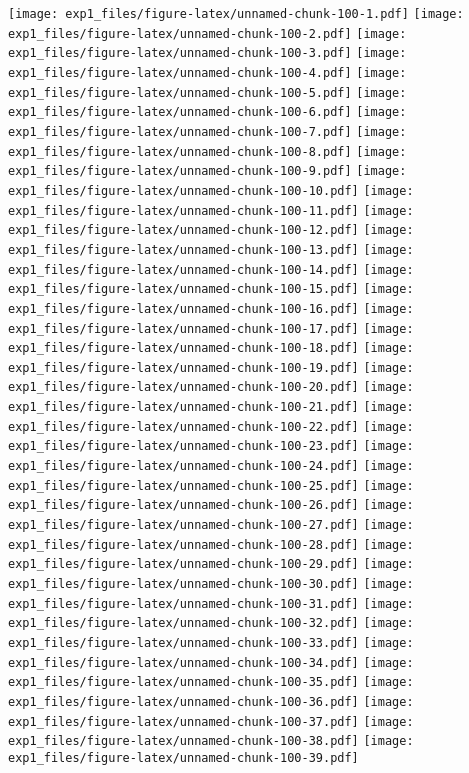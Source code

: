 \documentclass[11pt,,]{article}
\begin{document}
\texttt{[image: exp1\_files/figure-latex/unnamed-chunk-100-1.pdf]}
\texttt{[image: exp1\_files/figure-latex/unnamed-chunk-100-2.pdf]}
\texttt{[image: exp1\_files/figure-latex/unnamed-chunk-100-3.pdf]}
\texttt{[image: exp1\_files/figure-latex/unnamed-chunk-100-4.pdf]}
\texttt{[image: exp1\_files/figure-latex/unnamed-chunk-100-5.pdf]}
\texttt{[image: exp1\_files/figure-latex/unnamed-chunk-100-6.pdf]}
\texttt{[image: exp1\_files/figure-latex/unnamed-chunk-100-7.pdf]}
\texttt{[image: exp1\_files/figure-latex/unnamed-chunk-100-8.pdf]}
\texttt{[image: exp1\_files/figure-latex/unnamed-chunk-100-9.pdf]}
\texttt{[image: exp1\_files/figure-latex/unnamed-chunk-100-10.pdf]}
\texttt{[image: exp1\_files/figure-latex/unnamed-chunk-100-11.pdf]}
\texttt{[image: exp1\_files/figure-latex/unnamed-chunk-100-12.pdf]}
\texttt{[image: exp1\_files/figure-latex/unnamed-chunk-100-13.pdf]}
\texttt{[image: exp1\_files/figure-latex/unnamed-chunk-100-14.pdf]}
\texttt{[image: exp1\_files/figure-latex/unnamed-chunk-100-15.pdf]}
\texttt{[image: exp1\_files/figure-latex/unnamed-chunk-100-16.pdf]}
\texttt{[image: exp1\_files/figure-latex/unnamed-chunk-100-17.pdf]}
\texttt{[image: exp1\_files/figure-latex/unnamed-chunk-100-18.pdf]}
\texttt{[image: exp1\_files/figure-latex/unnamed-chunk-100-19.pdf]}
\texttt{[image: exp1\_files/figure-latex/unnamed-chunk-100-20.pdf]}
\texttt{[image: exp1\_files/figure-latex/unnamed-chunk-100-21.pdf]}
\texttt{[image: exp1\_files/figure-latex/unnamed-chunk-100-22.pdf]}
\texttt{[image: exp1\_files/figure-latex/unnamed-chunk-100-23.pdf]}
\texttt{[image: exp1\_files/figure-latex/unnamed-chunk-100-24.pdf]}
\texttt{[image: exp1\_files/figure-latex/unnamed-chunk-100-25.pdf]}
\texttt{[image: exp1\_files/figure-latex/unnamed-chunk-100-26.pdf]}
\texttt{[image: exp1\_files/figure-latex/unnamed-chunk-100-27.pdf]}
\texttt{[image: exp1\_files/figure-latex/unnamed-chunk-100-28.pdf]}
\texttt{[image: exp1\_files/figure-latex/unnamed-chunk-100-29.pdf]}
\texttt{[image: exp1\_files/figure-latex/unnamed-chunk-100-30.pdf]}
\texttt{[image: exp1\_files/figure-latex/unnamed-chunk-100-31.pdf]}
\texttt{[image: exp1\_files/figure-latex/unnamed-chunk-100-32.pdf]}
\texttt{[image: exp1\_files/figure-latex/unnamed-chunk-100-33.pdf]}
\texttt{[image: exp1\_files/figure-latex/unnamed-chunk-100-34.pdf]}
\texttt{[image: exp1\_files/figure-latex/unnamed-chunk-100-35.pdf]}
\texttt{[image: exp1\_files/figure-latex/unnamed-chunk-100-36.pdf]}
\texttt{[image: exp1\_files/figure-latex/unnamed-chunk-100-37.pdf]}
\texttt{[image: exp1\_files/figure-latex/unnamed-chunk-100-38.pdf]}
\texttt{[image: exp1\_files/figure-latex/unnamed-chunk-100-39.pdf]}
\end{document}
